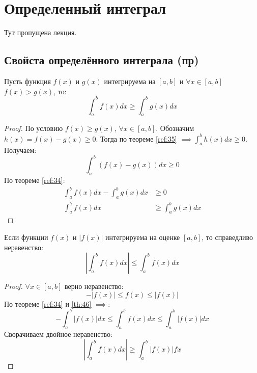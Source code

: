 \section{Определенный интеграл}

Тут пропущена лекция.

\subsection{Свойста определённого интеграла (пр)}

\begin{theorem}
  \label{th:36}
  Пусть функция $f(x)$ и  $g(x)$ интегрируема на  $[a, b]$ и $\forall x \in [a, b]$ $f(x) > g(x)$, то: \[
  \int_a^b f(x) dx \ge \int_a^b g(x)dx
  \] 
\end{theorem}
\begin{proof}
  По условию $f(x) \ge g(x)$, $\forall x \in [a, b]$. Обозначим $h(x) = f(x) - g(x) \ge 0$. Тогда по теореме \ref{ref:35} $\implies \int_a^b h(x) dx \ge 0$. Получаем: \[
  \int_a^b (f(x) - g(x)) dx \ge 0
  \] 
  По теореме \ref{ref:34}:
  \begin{align*}
    \int_a^b f(x) dx - \int_a^b g(x) dx &\ge 0 \\
    \int_a^b f(x) dx &\ge \int_a^b g(x) dx
  \end{align*}
\end{proof}

\begin{theorem}
  Если функции $f(x)$ и $|f(x)|$ интегрируема на оценке $[a, b]$, то справедливо неравенство:  \[
  \left| \int_a^b f(x) dx \right| \le \int_a^b f(x) dx
  \] 
\end{theorem}
\begin{proof}
  \label{th:37}
  $\forall x \in [a, b]$ верно неравенство: \[
    -|f(x)| \le f(x) \le |f(x)| 
  \] 
  По теореме \ref{ref:34} и \ref{th:46} $\implies$: \[
    -\int_a^b |f(x)| dx \le \int_a^b f(x) dx \le \int_a^b |f(x)| dx
  \] 
  Сворачиваем двойное неравенство: \[
    \left| \int_a^b f(x) dx \right| \ge \int_a^b | f(x) |fx
  \] 
\end{proof}

